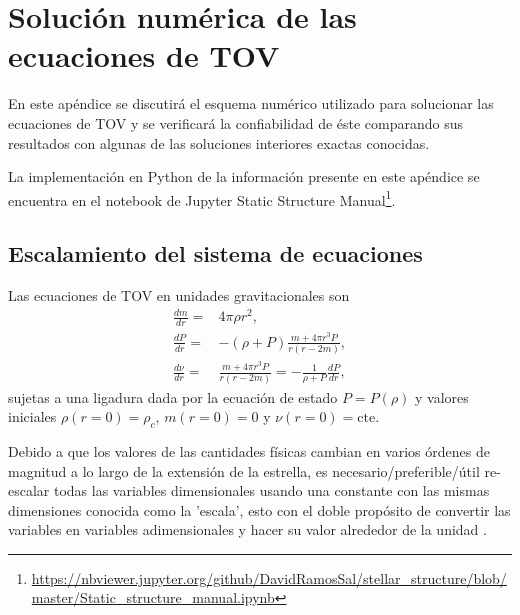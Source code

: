 \chapter{Solución numérica de las ecuaciones de TOV}\label{NumSol}
\noindent En este apéndice se discutirá el esquema numérico utilizado para solucionar las ecuaciones de TOV y se verificará la confiabilidad de éste comparando sus resultados con algunas de las soluciones interiores exactas conocidas.

La implementación en Python de la información presente en este apéndice se encuentra en el notebook de Jupyter Static Structure Manual\footnote{\url{https://nbviewer.jupyter.org/github/DavidRamosSal/stellar_structure/blob/master/Static_structure_manual.ipynb}}.

\section{Escalamiento del sistema de ecuaciones}
\noindent Las ecuaciones de TOV en unidades gravitacionales son
\begin{align}
    \frac{dm}{dr}=&4\pi \rho r^2 ,\\
    \frac{dP}{dr}=&-(\rho+P)\frac{m+4\pi r^3 P}{r(r-2m)} , \\
    \frac{d\nu}{dr}=& \frac{m+4\pi r^3 P}{r(r-2m)} =  -\frac{1}{\rho+P}\frac{dP}{dr},
\end{align}
sujetas a una ligadura dada por la ecuación de estado $P=P(\rho)$ y valores iniciales $\rho(r=0)=\rho_c$, $m(r=0)=0$ y $\nu(r=0)=\text{cte}$.

Debido a que los valores de las cantidades físicas cambian en varios órdenes de magnitud a lo largo de la extensión de la estrella, es necesario/preferible/útil re-escalar todas las variables dimensionales usando una constante con las mismas dimensiones conocida como la 'escala', esto con el doble propósito de convertir las variables en variables adimensionales y hacer su valor alrededor de la unidad \cite{Langtangen2016}.

